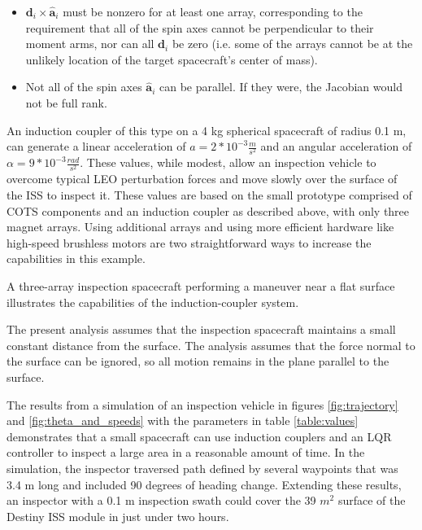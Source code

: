 \begin{itemize}
\item  $\boldsymbol{d}_i{\times}\hat{\boldsymbol{a}}_i$ must be nonzero for at least one array, corresponding to the requirement that all of the spin axes cannot be perpendicular to their moment arms, nor can all $\boldsymbol{d}_i$ be zero (i.e. some of the arrays cannot be at the unlikely location of the target spacecraft's center of mass).
\item  Not all of the spin axes $\hat{\boldsymbol{a}}_i$ can be parallel. If they were, the Jacobian would not be full rank.
\end{itemize}

An induction coupler of this type on a 4 kg spherical spacecraft of radius 0.1 m, can generate a linear acceleration of
$a = 2*10^{-3} \frac{m}{s^2}$ 
and an angular acceleration of 
$\alpha = 9*10^{-3} \frac{rad}{s^2}$. 
These values, while modest, allow an inspection vehicle to overcome typical LEO perturbation forces
\cite{wertz2011space}
 and move slowly over the surface of the ISS to inspect it. These values are based on the small prototype comprised of COTS components and an induction coupler as described above, with only three magnet arrays. Using additional arrays and using more efficient hardware like high-speed brushless motors are two straightforward ways to increase the capabilities in this example.

A three-array inspection spacecraft performing a maneuver near a flat surface illustrates the capabilities of the induction-coupler system. 

The present analysis assumes that the inspection spacecraft maintains a small constant distance from the surface. The analysis assumes that the force normal to the surface can be ignored, so all motion remains in the plane parallel to the surface. 

The results from a simulation of an inspection vehicle in figures \ref{fig:trajectory} and \ref{fig:theta_and_speeds} with the parameters in table \ref{table:values} demonstrates that a small spacecraft can use induction couplers and an LQR controller to inspect a large area in a 
reasonable amount of time. In the simulation, the inspector traversed path defined by several waypoints that was 3.4 m long and included 90 degrees of heading change. Extending these results, an inspector with a 0.1 m inspection swath could cover the 39 $m^2$ surface of the Destiny ISS module in just under two hours.   

